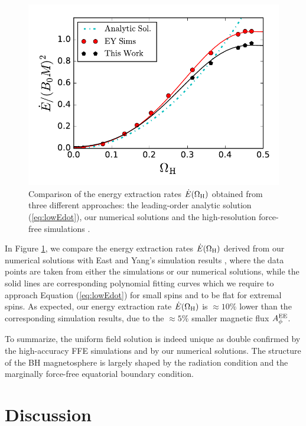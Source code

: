 \documentclass[aps,prd,reprint,nofootinbib, superscriptaddress]{revtex4-1}
\def\WH{\Omega_{\rm H}}
\def\AEE{A_\phi^{\rm EE}}
\begin{document}
\begin{figure}
\includegraphics[scale=0.7]{f3}
\caption{\label{fig:Edot} Comparison of the energy extraction rates $\dot E(\WH)$ obtained from
three different approaches: the leading-order analytic solution (\ref{eq:lowEdot}),
our numerical solutions and  the high-resolution force-free simulations \cite{East2018}.}
\end{figure}

In Figure \ref{fig:Edot}, we compare the energy extraction rates $\dot E(\WH)$
derived from our numerical solutions with East and Yang's simulation results
\cite{East2018}, where the data points are taken from either the simulations
or our numerical solutions, while the solid lines are corresponding polynomial
fitting curves which we require to approach Equation (\ref{eq:lowEdot}) for small
spins and to be flat for extremal spins. As expected, our energy extraction
rate $\dot E(\WH)$ is $\approx 10\%$ lower than the corresponding simulation results,
due to the $\approx 5\%$ smaller magnetic flux $\AEE$.

To summarize, the uniform field solution is indeed unique as double confirmed by the high-accuracy FFE
simulations and by our numerical solutions. The  structure of the BH magnetosphere
is largely shaped by the radiation condition and the marginally force-free
equatorial boundary condition.

\section{Discussion}
\label{sec:discussion}
\end{document}
